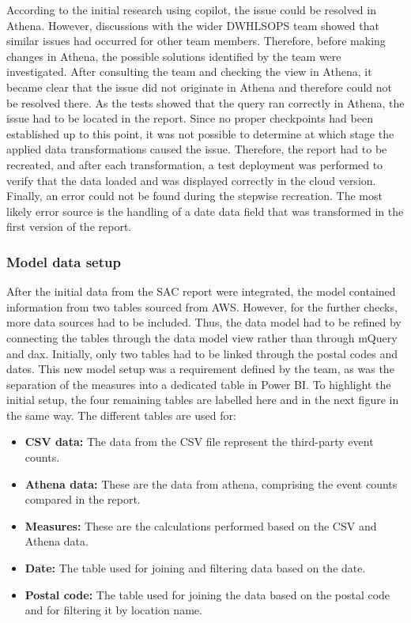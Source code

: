 According to the initial research using \gls{copilot}, the issue could be resolved in Athena. However, discussions with the wider \gls{DWHLSOPS} team showed that similar issues had occurred for other team members. Therefore, before making changes in Athena, the possible solutions identified by the team were investigated. After consulting the team and checking the view in Athena, it became clear that the issue did not originate in Athena and therefore could not be resolved there. As the tests showed that the query ran correctly in Athena, the issue had to be located in the report. Since no proper checkpoints had been established up to this point, it was not possible to determine at which stage the applied data transformations caused the issue. Therefore, the report had to be recreated, and after each transformation, a test deployment was performed to verify that the data loaded and was displayed correctly in the cloud version. Finally, an error could not be found during the stepwise recreation. The most likely error source is the handling of a date data field that was transformed in the first version of the report.



\subsubsection*{Model data setup}

After the initial data from the \gls{SAC} report were integrated, the model contained information from two tables sourced from AWS. However, for the further checks, more data sources had to be included. Thus, the data model had to be refined by connecting the tables through the data model view rather than through \gls{mQuery} and \gls{dax}. Initially, only two tables had to be linked through the postal codes and dates. This new model setup was a requirement defined by the team, as was the separation of the measures into a dedicated table in Power BI. To highlight the initial setup, the four remaining tables are labelled here and in the next figure in the same way. The different tables are used for:

\begin{itemize}
    \item \textbf{CSV data:} The data from the CSV file represent the third-party event counts.
    \item \textbf{Athena data:} These are the data from \gls{athena}, comprising the event counts compared in the report.
    \item \textbf{Measures:} These are the calculations performed based on the CSV and Athena data.
    \item \textbf{Date:} The table used for joining and filtering data based on the date.
    \item \textbf{Postal code:} The table used for joining the data based on the postal code and for filtering it by location name.
\end{itemize}



